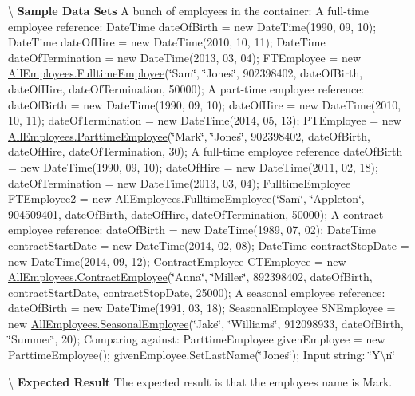 \textbackslash{} {\bfseries  Sample Data Sets} A bunch of employees in the container\+: A full-\/time employee reference\+: Date\+Time date\+Of\+Birth = new Date\+Time(1990, 09, 10); Date\+Time date\+Of\+Hire = new Date\+Time(2010, 10, 11); Date\+Time date\+Of\+Termination = new Date\+Time(2013, 03, 04); F\+T\+Employee = new \hyperlink{class_all_employees_1_1_fulltime_employee}{All\+Employees.\+Fulltime\+Employee}(\char`\"{}\+Sam\char`\"{}, \char`\"{}\+Jones\char`\"{}, 902398402, date\+Of\+Birth, date\+Of\+Hire, date\+Of\+Termination, 50000); A part-\/time employee reference\+: date\+Of\+Birth = new Date\+Time(1990, 09, 10); date\+Of\+Hire = new Date\+Time(2010, 10, 11); date\+Of\+Termination = new Date\+Time(2014, 05, 13); P\+T\+Employee = new \hyperlink{class_all_employees_1_1_parttime_employee}{All\+Employees.\+Parttime\+Employee}(\char`\"{}\+Mark\char`\"{}, \char`\"{}\+Jones\char`\"{}, 902398402, date\+Of\+Birth, date\+Of\+Hire, date\+Of\+Termination, 30); A full-\/time employee reference date\+Of\+Birth = new Date\+Time(1990, 09, 10); date\+Of\+Hire = new Date\+Time(2011, 02, 18); date\+Of\+Termination = new Date\+Time(2013, 03, 04); Fulltime\+Employee F\+T\+Employee2 = new \hyperlink{class_all_employees_1_1_fulltime_employee}{All\+Employees.\+Fulltime\+Employee}(\char`\"{}\+Sam\char`\"{}, \char`\"{}\+Appleton\char`\"{}, 904509401, date\+Of\+Birth, date\+Of\+Hire, date\+Of\+Termination, 50000); A contract employee reference\+: date\+Of\+Birth = new Date\+Time(1989, 07, 02); Date\+Time contract\+Start\+Date = new Date\+Time(2014, 02, 08); Date\+Time contract\+Stop\+Date = new Date\+Time(2014, 09, 12); Contract\+Employee C\+T\+Employee = new \hyperlink{class_all_employees_1_1_contract_employee}{All\+Employees.\+Contract\+Employee}(\char`\"{}\+Anna\char`\"{}, \char`\"{}\+Miller\char`\"{}, 892398402, date\+Of\+Birth, contract\+Start\+Date, contract\+Stop\+Date, 25000); A seasonal employee reference\+: date\+Of\+Birth = new Date\+Time(1991, 03, 18); Seasonal\+Employee S\+N\+Employee = new \hyperlink{class_all_employees_1_1_seasonal_employee}{All\+Employees.\+Seasonal\+Employee}(\char`\"{}\+Jake\char`\"{}, \char`\"{}\+Williams\char`\"{}, 912098933, date\+Of\+Birth, \char`\"{}\+Summer\char`\"{}, 20); Comparing against\+: Parttime\+Employee given\+Employee = new Parttime\+Employee(); given\+Employee.\+Set\+Last\+Name(\char`\"{}\+Jones\char`\"{}); Input string\+: \char`\"{}\+Y\textbackslash{}n\char`\"{}

\textbackslash{} {\bfseries  Expected Result} The expected result is that the employee\textquotesingle{}s name is Mark.

